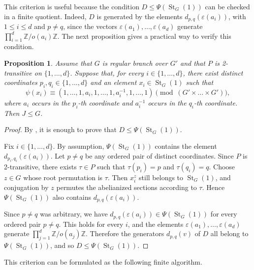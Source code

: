\documentclass[11pt,leqno]{amsart}
\theoremstyle{plain}
\newtheorem{proposition}[proposition]{Proposition}
\DeclareMathOperator{\St}{St}
\numberwithin{equation}{section}
\begin{document}
This criterion is useful because the condition $D\leq \Psi(\St_G(1))$ can be checked in a finite quotient. Indeed, $D$ is generated by the elements $d_{p,q}(\varepsilon(a_i))$, with $1\leq i\leq d$ and $p\neq q$, since the vectors $\varepsilon(a_1),\ldots,\varepsilon(a_d)$ generate $\prod_{i=1}^d \mathbb Z/o(a_i)\mathbb Z$. The next proposition gives a practical way to verify this condition. 
\begin{proposition}\label{prop:two-transitive-transfer}
    Assume that $G$ is regular branch over $G'$ and that $P$ is 2-transitive on $\{1,\ldots,d\}$. Suppose that, for every $i\in\{1,\ldots,d\}$, there exist distinct coordinates $p_i,q_i\in\{1,\ldots,d\}$ and an element $x_i\in \St_G(1)$ such that
    $$
    \psi(x_i)\equiv(1,\ldots,1,a_i,1,\ldots,1,a_i^{-1},1,\ldots,1)
    \pmod{(G'\times \dots \times G')},
    $$
    where $a_i$ occurs in the $p_i$-th coordinate and $a_i^{-1}$ occurs in the $q_i$-th coordinate. Then $J\leq G$.
\end{proposition}
\begin{proof}
    By , it is enough to prove that $D\leq \Psi(\St_G(1))$.

    Fix $i\in\{1,\ldots,d\}$. By assumption, $\Psi(\St_G(1))$ contains the element $d_{p_i,q_i}(\varepsilon(a_i))$. Let $p\neq q$ be any ordered pair of distinct coordinates. Since $P$ is 2-transitive, there exists $\tau\in P$ such that $\tau(p_i)=p$ and $\tau(q_i)=q$. Choose $z\in G$ whose root permutation is $\tau$. Then $x_i^z$ still belongs to $\St_G(1)$, and conjugation by $z$ permutes the abelianized sections according to $\tau$. Hence $\Psi(\St_G(1))$ also contains $d_{p,q}(\varepsilon(a_i))$.

    Since $p\neq q$ was arbitrary, we have $d_{p,q}(\varepsilon(a_i))\in \Psi(\St_G(1))$ for every ordered pair $p\neq q$. This holds for every $i$, and the elements $\varepsilon(a_1),\ldots,\varepsilon(a_d)$ generate $\prod_{j=1}^d \mathbb Z/o(a_j)\mathbb Z$. Therefore the generators $d_{p,q}(v)$ of $D$ all belong to $\Psi(\St_G(1))$, and so $D\leq \Psi(\St_G(1))$.
\end{proof}

This criterion can be formulated as the following finite algorithm.
\end{document}
